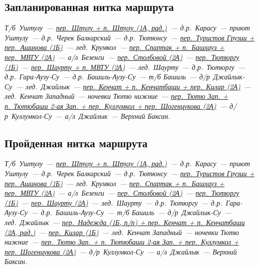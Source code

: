 	
	\subsection{Запланированная нитка маршрута}\label{subsec:planned_route}
		\renewcommand{\bfdefault}{bx}
		\textit{
			Т/б~Уштулу~---
			\hyperref[subsec:main_obstacles]{пер.~Штулу + п.~Штулу (1А, рад.)}~---
			д.р.~Карасу~---
			приют Уштулу~---
			д.р.~Черек Балкарский~---
			д.р.~Тютюнсу~---
			\hyperref[subsec:main_obstacles]{пер.~Туристов Грузии + пер.~Ашинова (1Б)}~---
			лед.~Крумкол~---
			\hyperref[subsec:main_obstacles]{пер.~Спартак + п.~Башхауз + пер.~МВТУ (2А)}~---
			а/л~Безенги~---
			\hyperref[subsec:main_obstacles]{пер.~Столбовой (2А)}~---
			\hyperref[subsec:main_obstacles]{пер.~Тютюргу (1Б)}~---
			\hyperref[subsec:main_obstacles]{пер.~Шаурту + п. МВТУ (2А)}~---
			лед.~Шаурту~---
			д.р.~Тютюргу~---
			д.р.~Гара-Аузу-Су~---
			д.р.~Башиль-Аузу-Су~---
			т/б Башиль~---
			д/р~Джайлык-Су~---
			лед.~Джайлык~---
			\hyperref[subsec:main_obstacles]{пер.~Кенчат + п.~Кенчатбаши + пер.~Килар (2А)}~---
			лед.~Кенчат Западный~---
			ночевки Тютю нижние~---
			\hyperref[subsec:main_obstacles]{пер.~Тютю Зап. + п.~Тютюбаши 2-ая Зап. + пер.~Куллумкол + пер.~Шогенцукова (2А)}~---
			д/р~Куллумкол-Су~---
			а/л~Джайлык~---
			Верхний Баксан.
			}
	
	\subsection{Пройденная нитка маршрута}\label{subsec:real_route}
		\textit{
			Т/б~Уштулу~---
			\hyperref[subsec:main_obstacles]{пер.~Штулу + п.~Штулу (1А, рад.)}~---
			д.р.~Карасу~---
			приют Уштулу~---
			д.р.~Черек Балкарский~---
			д.р.~Тютюнсу~---
			\hyperref[subsec:main_obstacles]{пер.~Туристов Грузии + пер.~Ашинова (1Б)}~---
			лед.~Крумкол~---
			\hyperref[subsec:main_obstacles]{пер.~Спартак + п.~Башхауз + пер.~МВТУ (2А)}~---
			а/л~Безенги~---
			\hyperref[subsec:main_obstacles]{пер.~Столбовой (2А)}~---
			\hyperref[subsec:main_obstacles]{пер.~Тютюргу (1Б)}~---
			\hyperref[subsec:main_obstacles]{пер.~Шаурту (2А)}~---
			лед.~Шаурту~---
			д.р.~Тютюргу~---
			д.р.~Гара-Аузу-Су~---
			д.р.~Башиль-Аузу-Су~---
			т/б Башиль~---
			д/р~Джайлык-Су~---
			лед.~Джайлык~---
			\hyperref[subsec:main_obstacles]{пер.~Надежда (1Б, п/п) + пер.~Кенчат + п.~Кенчатбаши (2А, рад.)}~---
			\hyperref[subsec:main_obstacles]{пер.~Килар (1Б)}~---
			лед.~Кенчат Западный~---
			ночевки Тютю нижние~---
			\hyperref[subsec:main_obstacles]{пер.~Тютю Зап. + п.~Тютюбаши 2-ая Зап. + пер.~Куллумкол + пер.~Шогенцукова (2А)}~---
			д/р~Куллумкол-Су~---
			а/л~Джайлык~---
			Верхний Баксан.
			}
		\renewcommand{\bfdefault}{b}

